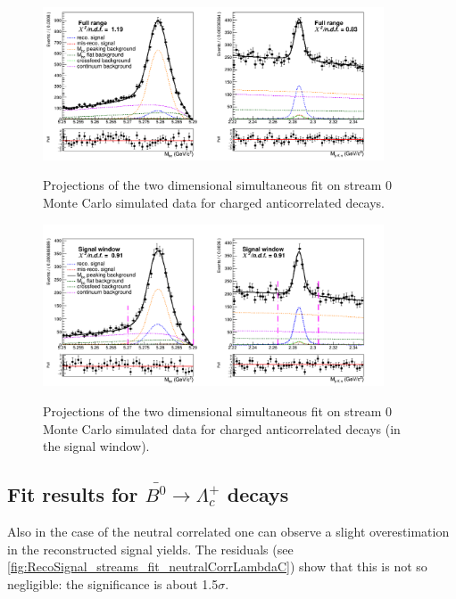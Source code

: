 \begin{figure}[H]
\centering
{\includegraphics[width=0.90\textwidth]{04-SimultaneousFit/figs/charged_antiSample_simultaneous2DFit_stream0.png}}
\caption{Projections of the two dimensional simultaneous fit on stream 0 Monte Carlo simulated data for charged anticorrelated decays.}
\label{fig:charged_antiSample_simultaneous2DFit_stream0}
\end{figure}

\begin{figure}[H]
    \centering
    {\includegraphics[width=0.90\textwidth]{04-SimultaneousFit/figs/charged_antiSignal_window_Total_2DFit_stream0.png}}
    \caption{Projections of the two dimensional simultaneous fit on stream 0 Monte Carlo simulated data for charged anticorrelated decays (in the signal window).}
    \label{fig:charged_antiSignal_window_Total_2DFit_stream0}
    \end{figure}

\newpage
\subsection{Fit results for $\bar{B^0} \rightarrow \Lambda_c^+$ decays}  
    
Also in the case of the neutral correlated one can observe a slight overestimation in the reconstructed signal yields.
The residuals (see \cref{fig:RecoSignal_streams_fit_neutralCorrLambdaC}) show that this is not so negligible: 
the significance is about 1.5$\sigma$.

